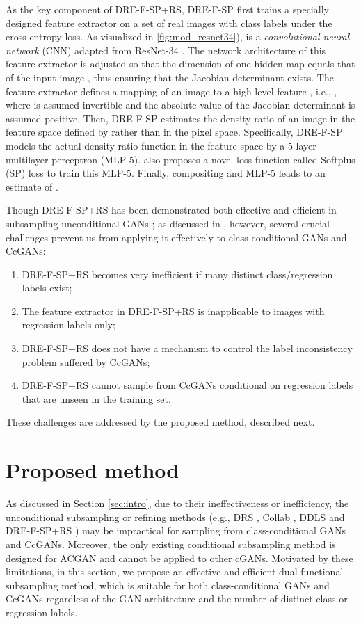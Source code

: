 \documentclass[final,12pt, 3p,times]{elsarticle}
\begin{document}
As the key component of DRE-F-SP+RS, DRE-F-SP first trains a specially designed feature extractor  on a set of real images with class labels under the cross-entropy loss. As visualized in \cref{fig:mod_resnet34}),  is a \textit{convolutional neural network} (CNN) adapted from ResNet-34 \cite{he2016deep}. The network architecture of this feature extractor is adjusted so that the dimension of one hidden map  equals that of the input image , thus ensuring that the Jacobian determinant  exists. The feature extractor defines a mapping of an image  to a high-level feature , i.e., , where  is assumed invertible and the absolute value of the Jacobian determinant  is assumed positive. Then, DRE-F-SP estimates the density ratio of an image in the feature space defined by  rather than in the pixel space. Specifically, DRE-F-SP models the actual density ratio function in the feature space by a 5-layer multilayer perceptron (MLP-5). \cite{ding2020subsampling} also proposes a novel loss function called Softplus (SP) loss to train this MLP-5. Finally, compositing  and MLP-5 leads to an estimate of .

Though DRE-F-SP+RS has been demonstrated both effective and efficient in subsampling unconditional GANs \cite{ding2020subsampling}; as discussed in , however, several crucial challenges prevent us from applying it effectively to class-conditional GANs and CcGANs:
\begin{enumerate}[(C1)]
	\item DRE-F-SP+RS becomes very inefficient if many distinct class/regression labels exist;
	\item The feature extractor in DRE-F-SP+RS is inapplicable to images with regression labels only;
	\item DRE-F-SP+RS does not have a mechanism to control the label inconsistency problem suffered by CcGANs;
	\item DRE-F-SP+RS cannot sample from CcGANs conditional on regression labels that are unseen in the training set.
\end{enumerate}

These challenges are addressed by the proposed method, described next.

\section{Proposed method}\label{sec:method}
As discussed in Section \ref{sec:intro}, due to their ineffectiveness or inefficiency, the unconditional subsampling or refining methods (e.g., DRS \cite{azadi2018discriminator}, Collab \cite{liu2020collaborative}, DDLS \cite{che2020your} and DRE-F-SP+RS \cite{ding2020subsampling}) may be impractical for sampling from class-conditional GANs and CcGANs. Moreover, the only existing conditional subsampling method \cite{mo2019mining} is designed for ACGAN \cite{odena2017conditional} and cannot be applied to other cGANs. Motivated by these limitations, in this section, we propose an effective and efficient dual-functional subsampling method, which is suitable for both class-conditional GANs and CcGANs regardless of the GAN architecture and the number of distinct class or regression labels. 
\end{document}
